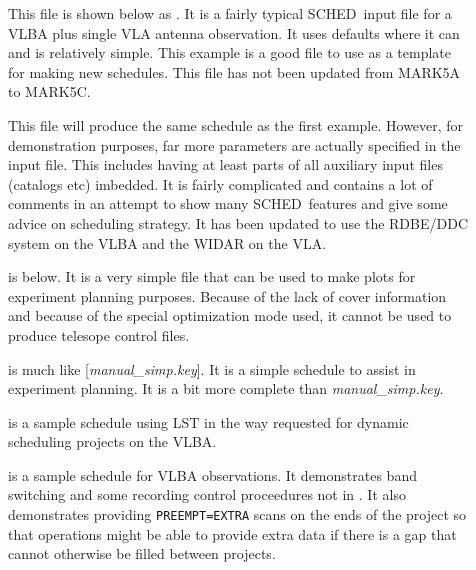 \documentclass{report}
\newcommand{\schedb}{{\sc SCHED~}}
\begin{document}
\begin{description}

\item[] This
file is shown below as .  It
is a fairly typical \schedb input file for a VLBA plus single VLA
antenna observation.  It uses defaults where it can and is relatively
simple.  This example is a good file to use as a template for making
new schedules. This file has not been updated from MARK5A to MARK5C.

\item[]
This file will produce the same schedule as the
first example.  However, for demonstration purposes, far more
parameters are actually specified in the input file.  This includes
having at least parts of all auxiliary input files (catalogs etc)
imbedded.  It is fairly complicated and contains a lot of comments in
an attempt to show many \schedb features and give some advice on
scheduling strategy.  It has been updated to use the RDBE/DDC system
on the VLBA and the WIDAR on the VLA.

\item[] is  below.  It is a very simple file that can be
used to make plots for experiment planning purposes.  Because of the
lack of cover information and because of the special optimization mode
used, it cannot be used to produce telesope control files.

\item[] is
much like [{\sl manual\_simp.key}].  It is a simple schedule to assist
in experiment planning.  It is a bit more complete than {\sl
manual\_simp.key}.

\item[] is a
sample schedule using LST in the way requested for dynamic scheduling
projects on the VLBA.

\item[] is a
sample schedule for VLBA observations.  It demonstrates band switching
and some recording control proceedures not in .  It also demonstrates 
providing {\tt PREEMPT=EXTRA} scans on the ends of the project so
that operations might be able to provide extra data if there is a gap
that cannot otherwise be filled between projects.


\end{description}
\end{document}
